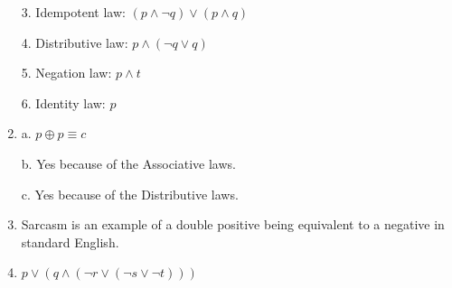 \documentclass{article}
\begin{document}
\begin{enumerate}[label=\textbf{\arabic*.}]
3. Idempotent law: $(p \land \neg q) \lor (p \land q)$

4. Distributive law: $p \land (\neg q \lor q)$

5. Negation law: $p \land t$

6. Identity law: $p$
\item %
a. $p \oplus p \equiv c$

b. Yes because of the Associative laws.

c. Yes because of the Distributive laws.
\item %
Sarcasm is an example of a double positive being equivalent to a negative in standard English.
\item %
$p \lor (q \land (\neg r \lor (\neg s \lor \neg t)))$

\end{enumerate}
\end{document}
